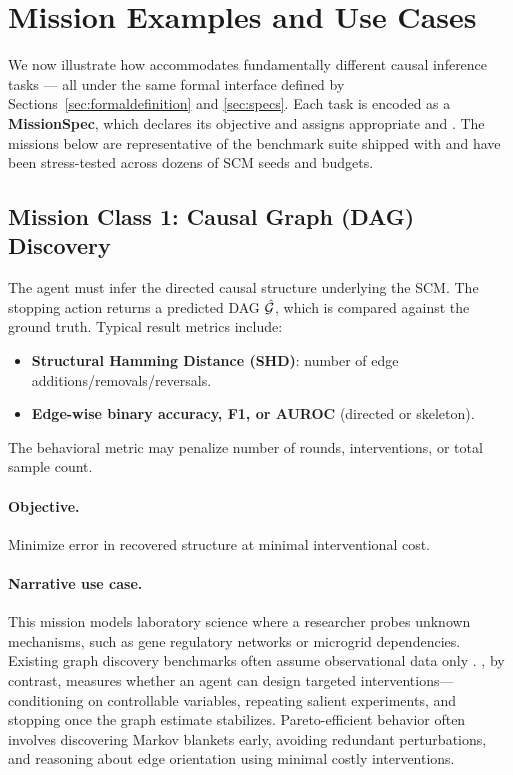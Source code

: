 \section{Mission Examples and Use Cases}
\label{sec:missions_examples}
We now illustrate how \game accommodates fundamentally different causal inference tasks — all under the same formal interface defined by Sections~\ref{sec:formaldefinition} and \ref{sec:specs}.  
Each task is encoded as a \textbf{MissionSpec}, which declares its objective and assigns appropriate \resultmetric and \behaviormetric. The missions below are representative of the benchmark suite shipped with \package and have been stress-tested across dozens of SCM seeds and budgets.

\subsection{Mission Class 1: Causal Graph (DAG) Discovery}
The agent must infer the directed causal structure underlying the SCM.  
The stopping action returns a predicted DAG $\hat{\mathcal{G}}$, which is compared against the ground truth.  
Typical result metrics include:
\begin{itemize}
    \item \textbf{Structural Hamming Distance (SHD)}: number of edge additions/removals/reversals.
    \item \textbf{Edge-wise binary accuracy, F1, or AUROC} (directed or skeleton).
\end{itemize}
The behavioral metric may penalize number of rounds, interventions, or total sample count.

\paragraph{Objective.} Minimize error in recovered structure at minimal interventional cost.

\paragraph{Narrative use case.}
This mission models laboratory science where a researcher probes unknown mechanisms, such as gene regulatory networks or microgrid dependencies. Existing graph discovery benchmarks often assume observational data only \citep{chengcausaltime,chevalley2023causalbench}. \game, by contrast, measures whether an agent can design targeted interventions—conditioning on controllable variables, repeating salient experiments, and stopping once the graph estimate stabilizes. Pareto-efficient behavior often involves discovering Markov blankets early, avoiding redundant perturbations, and reasoning about edge orientation using minimal costly interventions.

